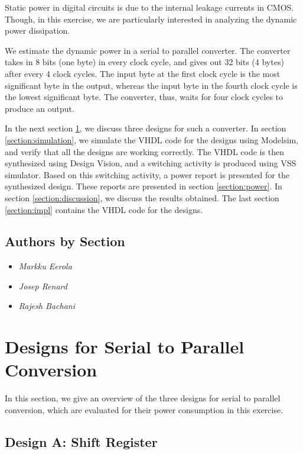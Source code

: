 \documentclass[11pt,a4paper]{article}
\begin{document}
Static power in digital circuits is due to the internal leakage currents in CMOS. Though, in this exercise, we are particularly interested in analyzing the dynamic power dissipation.

We estimate the dynamic power in a serial to parallel converter. The converter takes in 8 bits (one byte) in every clock cycle, and gives out 32 bits (4 bytes) after every 4 clock cycles. The input byte at the first clock cycle is the most significant byte in the output, whereas the input byte in the fourth clock cycle is the lowest significant byte. The converter, thus, waits for four clock cycles to produce an output.

In the next section \ref{section:designs}, we discuss three designs for such a converter. In section \ref{section:simulation}, we simulate the VHDL code for the designs using Modelsim, and verify that all the designs are working correctly. The VHDL code is then synthesized using Design Vision, and a switching activity is produced using VSS simulator. Based on this switching activity, a power report is presented for the synthesized design. These reports are presented in section \ref{section:power}. In section \ref{section:discussion}, we discuss the results obtained. The last section \ref{section:impl} contains the VHDL code for the designs.

\subsection{Authors by Section}
\begin{itemize}
\item \textit{Markku Eerola} 
\item \textit{Josep Renard} 
\item \textit{Rajesh Bachani} 
\end{itemize}


\section{Designs for Serial to Parallel Conversion}
\label{section:designs}
In this section, we give an overview of the three designs for serial to parallel conversion, which are evaluated for their power consumption in this exercise.

\subsection{Design A: Shift Register}
\end{document}
